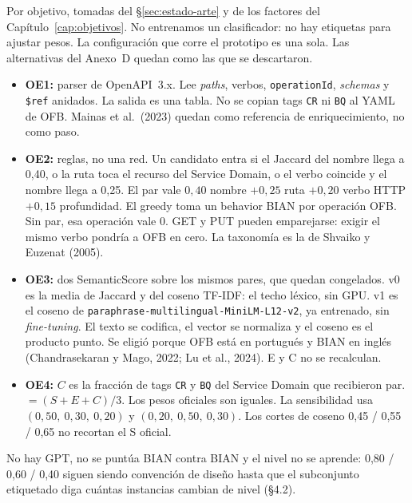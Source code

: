 Por objetivo, tomadas del §\ref{sec:estado-arte} y de los factores del Capítulo~\ref{cap:objetivos}.
No entrenamos un clasificador: no hay etiquetas para ajustar pesos. La configuración que corre
el prototipo es una sola. Las alternativas del Anexo~D quedan como las que se descartaron.

\begin{itemize}
  \item \textbf{OE1:} parser de OpenAPI~3.x. Lee \textit{paths}, verbos, \texttt{operationId},
        \textit{schemas} y \texttt{\$ref} anidados. La salida es una tabla. No se copian tags
        \texttt{CR} ni \texttt{BQ} al YAML de OFB. Mainas et al.\ (2023) quedan como referencia
        de enriquecimiento, no como paso.
  \item \textbf{OE2:} reglas, no una red. Un candidato entra si el Jaccard del nombre llega a
        0,40, o la ruta toca el recurso del Service Domain, o el verbo coincide y el nombre
        llega a 0,25. El par vale $0{,}40$ nombre $+ 0{,}25$ ruta $+ 0{,}20$ verbo HTTP
        $+ 0{,}15$ profundidad. El greedy toma un behavior BIAN por operación OFB. Sin par,
        esa operación vale 0. GET y PUT pueden emparejarse: exigir el mismo verbo pondría a
        OFB en cero. La taxonomía es la de Shvaiko y Euzenat (2005).
  \item \textbf{OE3:} dos SemanticScore sobre los mismos pares, que quedan congelados.
        v0 es la media de Jaccard y del coseno TF-IDF: el techo léxico, sin GPU. v1 es el
        coseno de \texttt{paraphrase-multilingual-\allowbreak MiniLM-L12-v2}, ya entrenado, sin
        \textit{fine-tuning}. El texto se codifica, el vector se normaliza y el coseno es el
        producto punto. Se eligió porque OFB está en portugués y BIAN en inglés
        (Chandrasekaran y Mago, 2022; Lu et al., 2024). E y C no se recalculan.
  \item \textbf{OE4:} $C$ es la fracción de tags \texttt{CR} y \texttt{BQ} del Service Domain
        que recibieron par. \AlignmentScore{} $= (S+E+C)/3$. Los pesos oficiales son iguales.
        La sensibilidad usa $(0{,}50,\ 0{,}30,\ 0{,}20)$ y $(0{,}20,\ 0{,}50,\ 0{,}30)$. Los
        cortes de coseno 0,45 / 0,55 / 0,65 no recortan el S oficial.
\end{itemize}

No hay GPT, no se puntúa BIAN contra BIAN y el nivel no se aprende: 0,80 / 0,60 / 0,40 siguen
siendo convención de diseño hasta que el subconjunto etiquetado diga cuántas instancias cambian
de nivel (§4.2).
